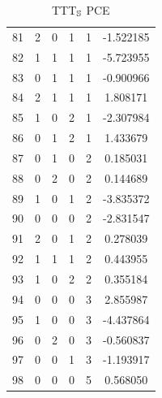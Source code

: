 \documentclass[preprint,12pt]{elsarticle}
\begin{document}
\begin{table}
\begin{minipage}[!h]{0.25\textwidth}
{\begin{tabular}{|c|cccc|c|}
81 &   2 &   0 &   1 &   1 &   -1.522185 \\
82 &   1 &   1 &   1 &   1 &   -5.723955 \\
83 &   0 &   1 &   1 &   1 &   -0.900966 \\
84 &   2 &   1 &   1 &   1 &    1.808171 \\
85 &   1 &   0 &   2 &   1 &   -2.307984 \\
86 &   0 &   1 &   2 &   1 &    1.433679 \\
87 &   0 &   1 &   0 &   2 &    0.185031 \\
88 &   0 &   2 &   0 &   2 &    0.144689 \\
89 &   1 &   0 &   1 &   2 &   -3.835372 \\
90 &   0 &   0 &   0 &   2 &   -2.831547 \\
91 &   2 &   0 &   1 &   2 &    0.278039 \\
92 &   1 &   1 &   1 &   2 &    0.443955 \\
93 &   1 &   0 &   2 &   2 &    0.355184 \\
94 &   0 &   0 &   0 &   3 &    2.855987 \\
95 &   1 &   0 &   0 &   3 &   -4.437864 \\
96 &   0 &   2 &   0 &   3 &   -0.560837 \\
97 &   0 &   0 &   1 &   3 &   -1.193917 \\
98 &   0 &   0 &   0 &   5 &    0.568050 \\
\hline
\end{tabular}}
\caption{TTT$_{\mathbb{S}}$ PCE}
\end{minipage}%
%
%
\begin{minipage}[!h]{0.25\textwidth}
\end{minipage}
\end{table}
\end{document}
